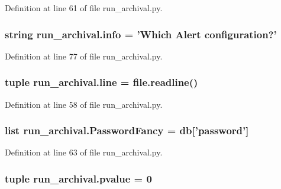 Definition at line 61 of file run\-\_\-archival.\-py.

\hypertarget{namespacerun__archival_a8ab6dc99642b199ed41dfc7ac9c88a92}{
\subsubsection[{info}]{\setlength{\rightskip}{0pt plus 5cm}string run\-\_\-archival.\-info = 'Which {\bf Alert} configuration?'}}\label{namespacerun__archival_a8ab6dc99642b199ed41dfc7ac9c88a92}


Definition at line 77 of file run\-\_\-archival.\-py.

\hypertarget{namespacerun__archival_ab8d2168a41c4abe996b487a690446cea}{
\subsubsection[{line}]{\setlength{\rightskip}{0pt plus 5cm}tuple run\-\_\-archival.\-line = file.\-readline()}}\label{namespacerun__archival_ab8d2168a41c4abe996b487a690446cea}


Definition at line 58 of file run\-\_\-archival.\-py.

\hypertarget{namespacerun__archival_adbfa915ad2708566274573eae9d849ad}{
\subsubsection[{Password\-Fancy}]{\setlength{\rightskip}{0pt plus 5cm}list run\-\_\-archival.\-Password\-Fancy = {\bf db}\mbox{[}'password'\mbox{]}}}\label{namespacerun__archival_adbfa915ad2708566274573eae9d849ad}


Definition at line 63 of file run\-\_\-archival.\-py.

\hypertarget{namespacerun__archival_ac8f3f0889be632da0acd346f3ec2d0ae}{
\subsubsection[{pvalue}]{\setlength{\rightskip}{0pt plus 5cm}tuple run\-\_\-archival.\-pvalue = 0}}\label{namespacerun__archival_ac8f3f0889be632da0acd346f3ec2d0ae}


